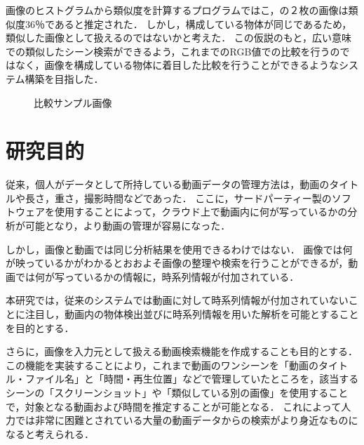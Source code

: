 \documentclass[a4j,12pt,dvipdfmx]{jreport}
\begin{document}
画像のヒストグラムから類似度を計算するプログラムではこ，の２枚の画像は類似度36％であると推定された．
しかし，構成している物体が同じであるため，類似した画像として扱えるのではないかと考えた．
この仮説のもと，広い意味での類似したシーン検索ができるよう，これまでのRGB値での比較を行うのではなく，画像を構成している物体に着目した比較を行うことができるようなシステム構築を目指した．

\vspace{2zh}
\begin{figure}[H]
  \centering
  \caption{\label{fig:hikaku} 比較サンプル画像}
\end{figure}

\clearpage
\section{研究目的}
従来，個人がデータとして所持している動画データの管理方法は，動画のタイトルや長さ，重さ，撮影時間などであった．
ここに，サードパーティー製のソフトウェアを使用することによって，クラウド上で動画内に何が写っているかの分析が可能となり，より動画の管理が容易になった．

しかし，画像と動画では同じ分析結果を使用できるわけではない．
画像では何が映っているかがわかるとおおよそ画像の整理や検索を行うことができるが，動画では何が写っているかの情報に，時系列情報が付加されている．

本研究では，従来のシステムでは動画に対して時系列情報が付加されていないことに注目し，動画内の物体検出並びに時系列情報を用いた解析を可能とすることを目的とする．

さらに，画像を入力元として扱える動画検索機能を作成することも目的とする．
この機能を実装することにより，これまで動画のワンシーンを「動画のタイトル・ファイル名」と「時間・再生位置」などで管理していたところを，該当するシーンの「スクリーンショット」や「類似している別の画像」を使用することで，対象となる動画および時間を推定することが可能となる．
これによって人力では非常に困難とされている大量の動画データからの検索がより身近なものになると考えられる．
\end{document}
